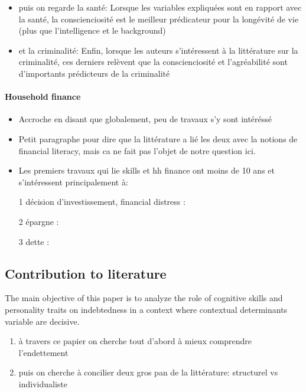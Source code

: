 \documentclass[a4paper, 11pt, onecolumn]{article}
\begin{document}
\begin{itemize}
\item puis on regarde la santé: Lorsque les variables expliquées sont en rapport avec la santé, la conscienciosité est le meilleur prédicateur pour la longévité de vie (plus que l’intelligence et le background) \citep{Almlund2011}
\item et la criminalité: Enfin, lorsque les auteurs s’intéressent à la littérature sur la criminalité, ces derniers relèvent que la conscienciosité et l’agréabilité sont d’importants prédicteurs de la criminalité \citep{Almlund2011} 
\end{itemize}

\paragraph{Household finance}
\begin{itemize}
\item Accroche en disant que globalement, peu de travaux s'y sont intéréssé
\item Petit paragraphe pour dire que la littérature a lié les deux avec la notions de financial literacy, mais ca ne fait pas l'objet de notre question ici. \citep{Hastings2013} \citep{Varum2014} \citep{Pinjisakikool2017} \citep{Gaurav2012} \citep{Hastings2013} 
\item Les premiers travaux qui lie skills et hh finance ont moins de 10 ans et s'intéressent principalement à:
\item[1] décision d'investissement, financial distress : \citep{Nga2013} \citep{Pinjisakikool2017b} \citep{Bucciol2017} \citep{Agarwal2013} \citep{Parise2019}
\item[2] épargne  : \citep{CobbClark2016} \citep{Gerhard2018}
\item[3] dette : \citep{Forlicz2019} \citep{Silva2018} \citep{Brown2014}
\end{itemize}




	\subsection{Contribution to literature}
The main objective of this paper is to analyze the role of cognitive skills and personality traits on indebtedness in a context where contextual determinants variable are decisive.
\begin{enumerate}
\item à travers ce papier on cherche tout d'abord à mieux comprendre l'endettement 
\item puis on cherche à concilier deux gros pan de la littérature: structurel vs individualiste
\end{enumerate}
\end{document}
